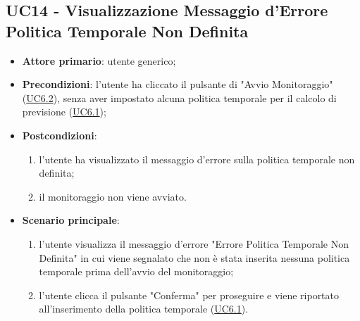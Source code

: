 
		\label{par:UC14}
	\subsection{UC14 - Visualizzazione Messaggio d'Errore Politica Temporale Non Definita}
		\begin{itemize}
			\item\textbf{Attore primario}: utente generico;
			\item\textbf{Precondizioni}: l’utente ha cliccato il pulsante di "Avvio Monitoraggio" (\hyperref[par:UC6.2]{UC6.2}), senza aver impostato alcuna politica temporale per il calcolo di previsione (\hyperref[par:UC6.1]{UC6.1});
			\item\textbf{Postcondizioni}:
				\begin{enumerate}
					\item l’utente ha visualizzato il messaggio d'errore sulla politica temporale non definita;		
					\item	il monitoraggio non viene avviato.
				\end{enumerate}
			\item\textbf{Scenario principale}:
				\begin{enumerate}
					\item l’utente visualizza il messaggio d'errore "Errore Politica Temporale Non Definita" in cui viene segnalato che non è stata inserita nessuna politica temporale prima dell'avvio del monitoraggio;
					\item l'utente clicca il pulsante "Conferma" per proseguire e viene riportato all'inserimento della politica temporale (\hyperref[par:UC6.1]{UC6.1}).		
				\end{enumerate}		
		\end{itemize}

	
		\label{par:UC15}
